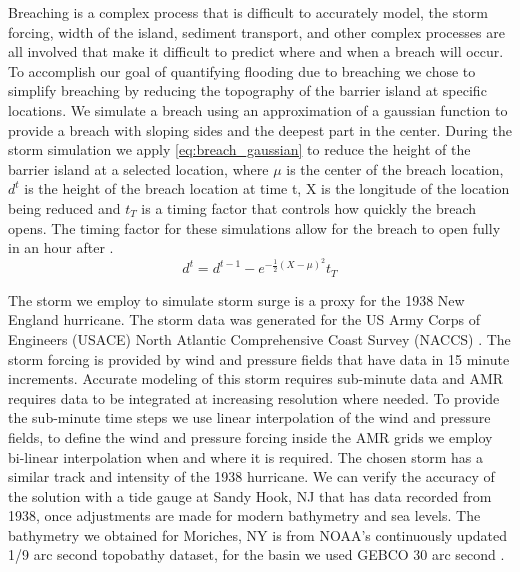 \documentclass{coastal_paper}
\begin{document}
Breaching is a complex process that is difficult to accurately model, the storm forcing, width of the island, sediment transport, and other complex processes are all involved that make it difficult to predict where and when a breach will occur. To accomplish our goal of quantifying flooding due to breaching we chose to simplify breaching by reducing the topography of the barrier island at specific locations. We simulate a breach using an approximation of a gaussian function to provide a breach with sloping sides and the deepest part in the center. During the storm simulation we apply \ref{eq:breach_gaussian} to reduce the height of the barrier island at a selected location, where $\mu$ is the center of the breach location, $d^t$ is the height of the breach location at time t, X is the longitude of the location being reduced and $t_T$ is a timing factor that controls how quickly the breach opens. The timing factor for these simulations allow for the breach to open fully in an hour after \citet{Visser1999}.
\begin{equation}
    d^t = d^{t-1} - e^{-\frac{1}{2}{(X - \mu)^2}}t_T
    \label{eq:breach_gaussian}
\end{equation}

The storm we employ to simulate storm surge is a proxy for the 1938 New England hurricane. The storm data was generated for the US Army Corps of Engineers (USACE) North Atlantic Comprehensive Coast Survey (NACCS) \citep{cialone2015north}. The storm forcing is provided by wind and pressure fields that have data in 15 minute increments. Accurate modeling of this storm requires sub-minute data and AMR requires data to be integrated at increasing resolution where needed. To provide the sub-minute time steps we use linear interpolation of the wind and pressure fields, to define the wind and pressure forcing inside the AMR grids we employ bi-linear interpolation when and where it is required. The chosen storm has a similar track and intensity of the 1938 hurricane. We can verify the accuracy of the solution with a tide gauge at Sandy Hook, NJ that has data recorded from 1938, once adjustments are made for modern bathymetry and sea levels. The bathymetry we obtained for Moriches, NY is from NOAA's continuously updated 1/9 arc second topobathy dataset, for the basin we used GEBCO 30 arc second \citep{cires2014continuously, weatherall2015new}.
\end{document}
